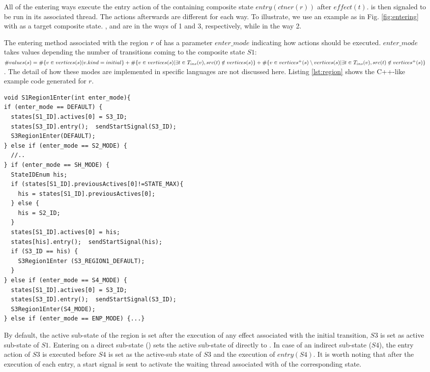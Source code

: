 All of the entering ways execute the entry action of the containing composite state $entry(ctner(r))$ after $effect(t)$.  is then signaled to be run in its associated thread. The actions afterwards are different for each way. To illustrate, we use an example as in Fig. \ref{fig:entering} with  as a target composite state. ,  and  are in the ways of 1 and 3, respectively, while  in the way 2. 

The entering method associated with the region $r$ of  has a parameter $enter\_mode$ indicating how actions should be executed. $enter\_mode$ takes values depending the number of transitions coming to the composite state $S1$: $\#values(s) = \\ \#\{v \in vertices(s)| v.kind=initial\} + \\ \#\{v \in vertices(s)| \exists t \in T_{ins}(v), src(t) \notin vertices(s)\} + \\ 
\#\{v \in vertices^+(s)\setminus vertices(s)|\exists t \in T_{ins}(v), src(t) \notin vertices^+(s)\}$. 
The detail of how these modes are implemented in specific languages are not discussed here.
Listing \ref{lst:region} shows the C++-like example code generated for $r$.

  
\begin{lstlisting}[caption=Example code generated for the region of S1, label=lst:region]
void S1Region1Enter(int enter_mode){
if (enter_mode == DEFAULT) {
  states[S1_ID].actives[0] = S3_ID;
  states[S3_ID].entry();  sendStartSignal(S3_ID);
  S3Region1Enter(DEFAULT);
} else if (enter_mode == S2_MODE) { 
  //..
} if (enter_mode == SH_MODE) {
  StateIDEnum his;
  if (states[S1_ID].previousActives[0]!=STATE_MAX){
    his = states[S1_ID].previousActives[0];
  } else {
    his = S2_ID;
  }
  states[S1_ID].actives[0] = his;
  states[his].entry();  sendStartSignal(his);
  if (S3_ID == his) {
    S3Region1Enter (S3_REGION1_DEFAULT);
  } 
} else if (enter_mode == S4_MODE) {
  states[S1_ID].actives[0] = S3_ID;
  states[S3_ID].entry();  sendStartSignal(S3_ID);
  S3Region1Enter(S4_MODE);
} else if (enter_mode == ENP_MODE) {...}
\end{lstlisting}




By default, the active sub-state of the region is set after the execution of any effect associated with the initial transition, $S3$ is set as active sub-state of $S1$. 
Entering on a direct sub-state () sets the active sub-state of  directly to . 
In case of an indirect sub-state ($S4$), the entry action of $S3$ is executed before $S4$ is set as the active-sub state of $S3$ and the execution of $entry(S4)$. 
It is worth noting that after the execution of each entry, a start signal is sent to activate the waiting thread associated with  of the corresponding state.

